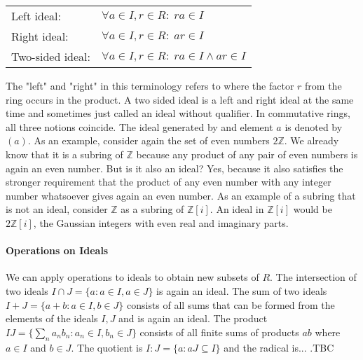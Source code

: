 \medskip
\begin{tabular}{l l}
Left ideal:      & $\forall a \in I, r \in R: \; r a \in I$  \\
Right ideal:     & $\forall a \in I, r \in R: \; a r \in I$  \\
Two-sided ideal: & $\forall a \in I, r \in R: \; r a \in I \wedge a r \in I$  \\
\end{tabular}
\medskip

The "left" and "right" in this terminology refers to where the factor $r$ from the ring occurs in the product. A two sided ideal is a left and right ideal at the same time and sometimes just called an ideal without qualifier. In commutative rings, all three notions coincide. The ideal generated by and element $a$ is denoted by $(a)$. As an example, consider again the set of even numbers $2 \mathbb{Z}$. We already know that it is a subring of $\mathbb{Z}$ because any product of any pair of even numbers is again an even number. But is it also an ideal? Yes, because it also satisfies the stronger requirement that the product of any even number with any integer number whatsoever gives again an even number. As an example of a subring that is not an ideal, consider $\mathbb{Z}$ as a subring of $\mathbb{Z}[i]$. An ideal in $\mathbb{Z}[i]$ would be $2\mathbb{Z}[i]$, the Gaussian integers with even real and imaginary parts.





\paragraph{Operations on Ideals} We can apply operations to ideals to obtain new subsets of $R$. The intersection of two ideals $I \cap J = \{a : a \in I, a \in J\}$ is again an ideal. The sum of two ideals $I + J = \{a + b : a \in I, b \in J\}$ consists of all sums that can be formed from the elements of the ideals $I,J$ and is again an ideal. The product $I J = \{\sum_n a_n b_n : a_n \in I, b_n \in J\}$ consists of all finite sums of products $a b$ where $a \in I$ and $b \in J$. The quotient is $I:J =  \{a : a J \subseteq I\}$ and the radical is... .TBC

